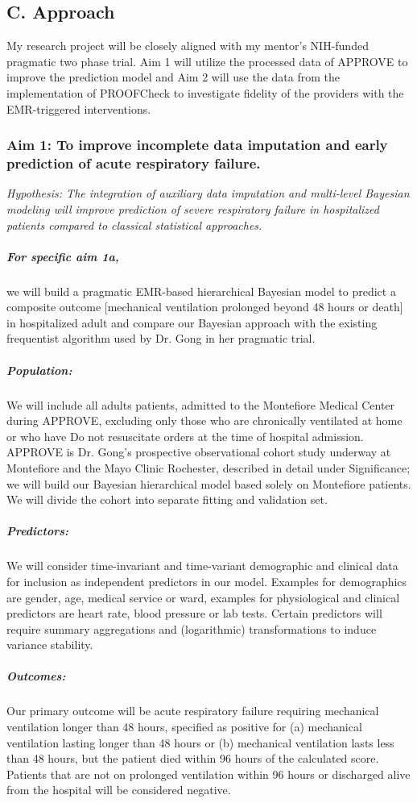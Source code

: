 \documentclass[11pt,notitlepage]{article}
\begin{document}
\subsection*{C. Approach}
My research project will be closely aligned with my mentor's NIH-funded pragmatic two phase trial. Aim 1 will utilize the processed data of APPROVE to improve the prediction model and Aim 2 will use the data from the implementation of PROOFCheck to investigate fidelity of the providers with the EMR-triggered interventions.

\subsubsection*{Aim 1: To improve incomplete data imputation and early prediction of acute respiratory failure.}


\textit{Hypothesis: The integration of auxiliary data imputation and multi-level Bayesian modeling will improve prediction of severe respiratory failure in hospitalized patients compared to classical statistical approaches.}


\subparagraph*{For specific aim 1a,} we will build a pragmatic EMR-based hierarchical Bayesian model to predict a composite outcome [mechanical ventilation prolonged beyond 48 hours or death] in hospitalized adult and compare our Bayesian approach with the existing frequentist algorithm used by Dr. Gong in her pragmatic trial.

\subparagraph*{Population:}
We will include all adults patients, admitted to the Montefiore Medical Center during APPROVE, excluding only those who are chronically ventilated at home or who have Do not resuscitate orders at the time of hospital admission. APPROVE is Dr. Gong's prospective observational cohort study underway at Montefiore and the Mayo Clinic Rochester, described in detail under Significance; we will build our Bayesian hierarchical model based solely on Montefiore patients. We will divide the cohort into separate fitting and validation set.

\subparagraph*{Predictors:}
We will consider time-invariant and time-variant demographic and clinical data for inclusion as independent predictors in our model. Examples for demographics are gender, age, medical service or ward, examples for physiological and clinical predictors are heart rate, blood pressure or lab tests. Certain predictors will require summary aggregations and (logarithmic) transformations to induce variance stability.

\subparagraph*{Outcomes:}
Our primary outcome will be acute respiratory failure requiring mechanical ventilation longer than 48 hours, specified as positive for (a) mechanical ventilation lasting longer than 48 hours or (b) mechanical ventilation lasts less than 48 hours, but the patient died within 96 hours of the calculated score. Patients that are not on prolonged ventilation within 96 hours or discharged alive from the hospital will be considered negative.
\end{document}
